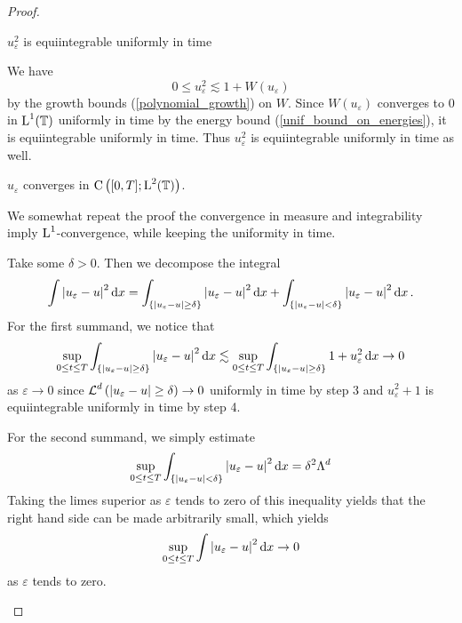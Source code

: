 \begin{proof}
\begin{description}[wide=0pt]
		\item[Step 4:] $ u_{ \varepsilon }^{ 2 } $ is equiintegrable uniformly in time
		
		We have 
		\begin{equation*}
			0 \leq u_{ \varepsilon }^{ 2 } \lesssim 1 + W ( u_{ \varepsilon } )
		\end{equation*}
		by the growth bounds (\ref{polynomial_growth}) on $ W $. Since $ W ( u_{ \varepsilon } ) $ converges to 0 in $ \operatorname{L}^{ 1 } ( \operatorname{\mathbb{T}} ) $ uniformly in time by the energy bound (\ref{unif_bound_on_energies}), it is equiintegrable uniformly in time. Thus $ u_{ \varepsilon }^{ 2 } $ is equiintegrable uniformly in time as well.
		
		\item[Step 5:] $ u_{ \varepsilon } $ converges in $ \operatorname{C} \left( [ 0 , T ] ; \operatorname{L}^{ 2 } ( \operatorname{\mathbb{T}} ) \right) $.
		
		We somewhat repeat the proof the convergence in measure and integrability imply $ \operatorname{L}^{ 1 } $-convergence, while keeping the uniformity in time.
		
		Take some $ \delta > 0 $. Then we decompose the integral
		\begin{equation*}
			\int \abs{ u_{ \varepsilon } - u }^{ 2 } \dd{ x }
			=
			\int_{ \{ \abs{ u_{ \varepsilon } - u } \geq \delta \} }
				\abs{ u_{\varepsilon } - u }^{ 2 }
			\dd{ x }
			+
			\int_{ \{ \abs{ u_{ \varepsilon } - u } < \delta \} }
				\abs{ u_{ \varepsilon } - u }^{ 2 }
			\dd{ x }.
		\end{equation*}
		For the first summand, we notice that
		\begin{equation*}
			\sup_{ 0 \leq t \leq T }
				\int_{ \{ \abs{ u_{ \varepsilon } - u } \geq \delta \} }
					\abs{ u_{\varepsilon } - u }^{ 2 }
				\dd{ x }
			\lesssim
			\sup_{ 0 \leq t \leq T }
				\int_{ \{ \abs{ u_{ \varepsilon } - u } \geq \delta \} }
					1 + u_{\varepsilon }^{ 2 }
				\dd{ x }
			\to 0
		\end{equation*}
		as $ \varepsilon \to 0 $ since $ \operatorname{\mathcal{L}}^{ d }\left( \abs{ u_{\varepsilon } - u } \geq \delta \right) \to 0 $ uniformly in time by step 3 and $ u_{\varepsilon }^{ 2 } + 1 $ is equiintegrable uniformly in time by step 4.
		
		For the second summand, we simply estimate
		\begin{equation*}
			\sup_{ 0 \leq t \leq T }
				\int_{ \{ \abs{ u_{ \varepsilon } - u } < \delta \} }
					\abs{ u_{ \varepsilon } - u }^{ 2 }
				\dd{ x }
			=
			\delta^{ 2 } \Lambda^{ d }
		\end{equation*}
		Taking the limes superior as $ \varepsilon $ tends to zero of this inequality yields that the right hand side can be made arbitrarily small, which yields
		\begin{equation*}
			\sup_{ 0 \leq t \leq T }
				\int
					\abs{ u_{ \varepsilon } - u }^{ 2 }
				\dd{ x }
			\to 
			0
		\end{equation*}
		as $ \varepsilon $ tends to zero.
	\end{description}
\end{proof}

